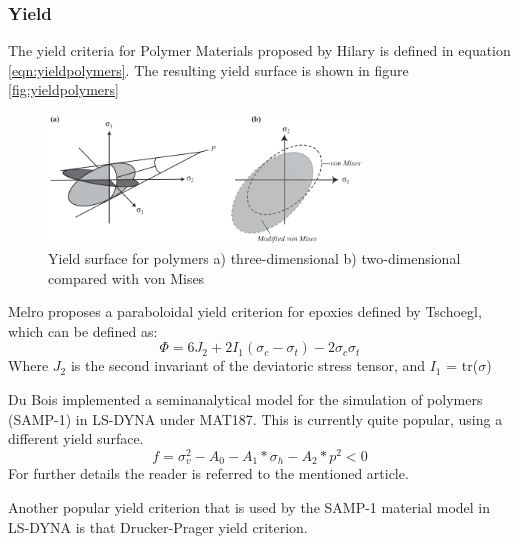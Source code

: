 \subsubsection{Yield}
The yield criteria for Polymer Materials proposed by Hilary\cite{Halary2011PolymerMaterials} is defined in equation \ref{eqn:yieldpolymers}. The resulting yield surface is shown in figure \ref{fig:yieldpolymers}

\begin{figure}[H]
    \centering
    \includegraphics[width=0.75\textwidth]{chapter_2/figures/yieldpolymers.png}
    \caption{Yield surface for polymers a) three-dimensional b) two-dimensional compared with von Mises \cite{Halary2011PolymerMaterials} }
    \label{fig:Midplane}
\end{figure}
Melro proposes a paraboloidal yield criterion for epoxies defined by Tschoegl, which can be defined as:
\begin{equation}\label{AzziTsai}
\Phi=6J_2+2I_1(\sigma_c-\sigma_t)-2\sigma_c\sigma_t
\end{equation}Where $J_2$ is the second invariant of the deviatoric stress tensor, and $I_1$ = tr(\textbf{$\sigma$})

Du Bois \cite{DuBois2006APolymers} implemented a seminanalytical model for the simulation of polymers (SAMP-1) in LS-DYNA under MAT187. This is currently quite popular,  using a different yield surface.
\begin{equation}\label{AzziTsai}
f=\sigma_v^2-A_0-A_1*\sigma_h-A_2*p^2<0
\end{equation}For further details the reader is referred to the mentioned article. 

Another popular yield criterion that is used by the SAMP-1 material model in LS-DYNA is that Drucker-Prager yield criterion. 

